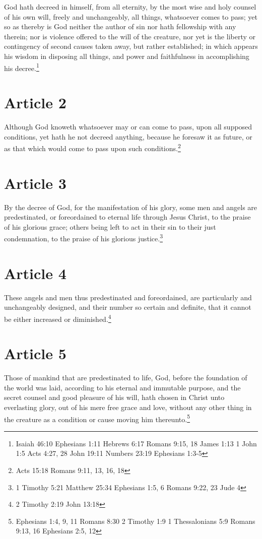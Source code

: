 \documentclass[12pt,letterpaper]{book}
\begin{document}
God hath decreed in himself, from all eternity, by the most wise and holy counsel of his own will, freely and unchangeably, all things, whatsoever comes to pass; yet so as thereby is God neither the author of sin nor hath fellowship with any therein; nor is violence offered to the will of the creature, nor yet is the liberty or contingency of second causes taken away, but rather established; in which appears his wisdom in disposing all things, and power and faithfulness in accomplishing his decree.\footnote{Isaiah 46:10 Ephesians 1:11 Hebrews 6:17 Romans 9:15, 18 James 1:13 1 John 1:5 Acts 4:27, 28 John 19:11 Numbers 23:19 Ephesians 1:3-5}

\section{Article 2}

Although God knoweth whatsoever may or can come to pass, upon all supposed conditions, yet hath he not decreed anything, because he foresaw it as future, or as that which would come to pass upon such conditions.\footnote{Acts 15:18 Romans 9:11, 13, 16, 18}

\section{Article 3}

By the decree of God, for the manifestation of his glory, some men and angels are predestinated, or foreordained to eternal life through Jesus Christ, to the praise of his glorious grace; others being left to act in their sin to their just condemnation, to the praise of his glorious justice.\footnote{1 Timothy 5:21 Matthew 25:34 Ephesians 1:5, 6 Romans 9:22, 23 Jude 4}

\section{Article 4}

These angels and men thus predestinated and foreordained, are particularly and unchangeably designed, and their number so certain and definite, that it cannot be either increased or diminished.\footnote{2 Timothy 2:19 John 13:18}

\section{Article 5}

Those of mankind that are predestinated to life, God, before the foundation of the world was laid, according to his eternal and immutable purpose, and the secret counsel and good pleasure of his will, hath chosen in Christ unto everlasting glory, out of his mere free grace and love, without any other thing in the creature as a condition or cause moving him thereunto.\footnote{Ephesians 1:4, 9, 11 Romans 8:30 2 Timothy 1:9 1 Thessalonians 5:9 Romans 9:13, 16 Ephesians 2:5, 12}
\end{document}
